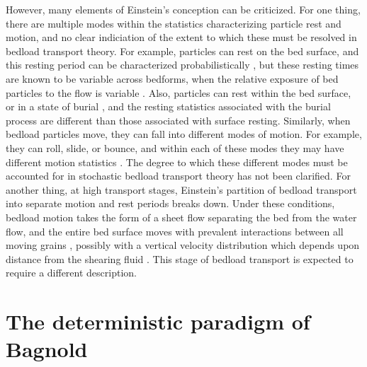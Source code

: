 \documentclass{article}
\begin{document}
However, many elements of Einstein's conception can be criticized. 
For one thing, there are multiple modes within the statistics characterizing particle rest and motion, and no clear indiciation of the extent to which these must be resolved in bedload transport theory. 
For example, particles can rest on the bed surface, and this resting period can be characterized probabilistically \citep{Einstein1950}, but these resting times are known to be variable across bedforms, when the relative exposure of bed particles to the flow is variable \citep{Crickmore1962, Sayre1967, Yang1971, Nakagawa1980}. 
Also, particles can rest within the bed surface, or in a state of burial \citep{Voepel2013, Martin2014, Olinde2015, Bradley2017}, and the resting statistics associated with the burial process are different than those associated with surface resting. 
Similarly, when bedload particles move, they can fall into different modes of motion. 
For example, they can roll, slide, or bounce, and within each of these modes they may have different motion statistics \citep{Frey2006, Frey2014}. 
The degree to which these different modes must be accounted for in stochastic bedload transport theory has not been clarified.  
For another thing, at high transport stages, Einstein's partition of bedload transport into separate motion and rest periods breaks down.
Under these conditions, bedload motion takes the form of a sheet flow separating the bed from the water flow, and the entire bed surface moves with prevalent interactions between all moving grains \cite{Jenkins1998, Clark2015}, possibly with a vertical velocity distribution which depends upon distance from the shearing fluid \citep{Bagnold1973, Frey2011, Mouilleron2009, Houssais2015, Ferdowski2016}.
This stage of bedload transport is expected to require a different description. 

\section{The deterministic paradigm of Bagnold} 
\end{document}
